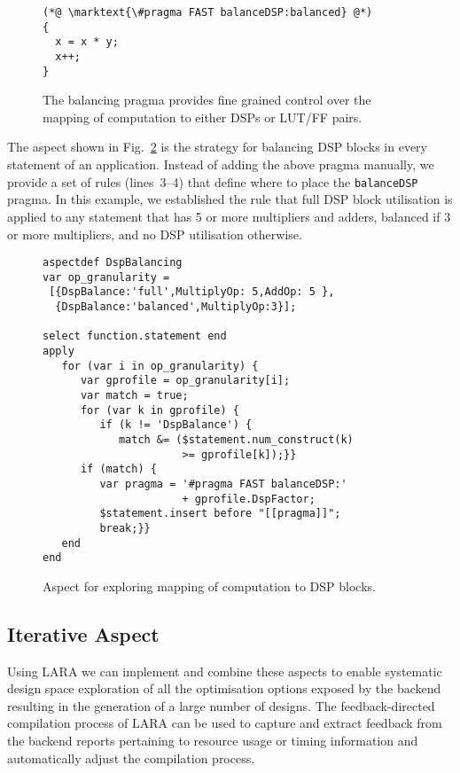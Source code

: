 \lstset{style=MaxC}
\begin{figure}[!h]
\begin{lstlisting}
(*@ \marktext{\#pragma FAST balanceDSP:balanced} @*)
{
  x = x * y;
  x++;
}
\end{lstlisting}
\caption{The \FAST{} balancing pragma provides fine grained control
  over the mapping of computation to either DSPs or LUT/FF pairs.}
\label{fig:aspect-balance}
\end{figure}

The aspect shown in Fig.~\ref{fig:aspect-DSP} is the strategy for
balancing DSP blocks in every statement of an application. Instead of
adding the above pragma manually, we provide a set of rules
(lines~3--4) that define where to place the \texttt{balanceDSP}
pragma. In this example, we established the rule that full DSP block
utilisation is applied to any statement that has 5 or more
multipliers and adders, balanced if 3 or more multipliers, and no DSP
utilisation otherwise.

\lstset{style=lara}
\begin{figure}[!h]
  \centering
  \begin{lstlisting}
aspectdef DspBalancing
var op_granularity =
 [{DspBalance:'full',MultiplyOp: 5,AddOp: 5 },
  {DspBalance:'balanced',MultiplyOp:3}];

select function.statement end
apply
   for (var i in op_granularity) {
      var gprofile = op_granularity[i];
      var match = true;
      for (var k in gprofile) {
         if (k != 'DspBalance') {
            match &= ($statement.num_construct(k)
                      >= gprofile[k]);}}
      if (match) {
         var pragma = '#pragma FAST balanceDSP:'
                      + gprofile.DspFactor;
         $statement.insert before "[[pragma]]";
         break;}}
   end
end
  \end{lstlisting}
  \caption{Aspect for exploring mapping of computation to DSP blocks.}
  \label{fig:aspect-DSP}
\end{figure}

\subsection{Iterative Aspect}
\label{sect:asp_it}
Using LARA we can implement and combine these aspects to enable
systematic design space exploration of all the optimisation options
exposed by the \FAST{} backend resulting in the generation of a large
number of designs. The feedback-directed compilation process of LARA
can be used to capture and extract feedback from the backend reports
pertaining to resource usage or timing information and automatically
adjust the compilation process.

